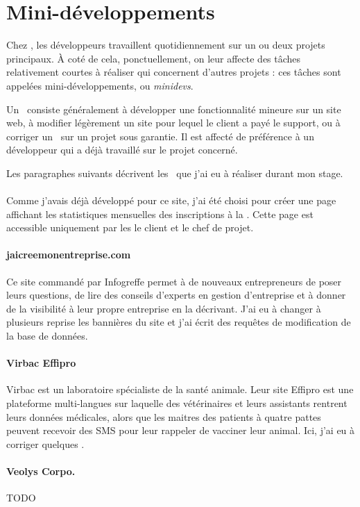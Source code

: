 \section{Mini-développements}

Chez \asl, les développeurs travaillent quotidiennement sur un ou deux projets principaux. À coté de cela, ponctuellement, on leur affecte des tâches relativement courtes à réaliser qui concernent d'autres projets : ces tâches sont appelées mini-développements, ou \emph{minidevs}.

Un \aminidev\ consiste généralement à développer une fonctionnalité mineure sur un site web, à modifier légèrement un site pour lequel le client a payé le support, ou à corriger un \abug\ sur un projet sous garantie. Il est affecté de préférence à un développeur qui a déjà travaillé sur le projet concerné. 

Les paragraphes suivants décrivent les \aminidevs\ que j'ai eu à réaliser durant mon stage.

\paragraph{\alc} Comme j'avais déjà développé pour ce site, j'ai été choisi pour créer une page affichant les statistiques mensuelles des inscriptions à la \anewsletter. Cette page est accessible uniquement par les le client et le chef de projet.

\paragraph{jaicreemonentreprise.com} Ce site commandé par Infogreffe permet à de nouveaux entrepreneurs de poser leurs questions, de lire des conseils d'experts en gestion d'entreprise et à donner de la visibilité à leur propre entreprise en la décrivant. J'ai eu à changer à plusieurs reprise les bannières du site et j'ai écrit des requêtes de modification de la base de données.

\paragraph{Virbac Effipro} Virbac est un laboratoire spécialiste de la santé animale. Leur site Effipro est une plateforme multi-langues sur laquelle des vétérinaires et leurs assistants rentrent leurs données médicales, alors que les maitres des patients à quatre pattes peuvent recevoir des SMS pour leur rappeler de vacciner leur animal. Ici, j'ai eu à corriger quelques \abugs.

\paragraph{Veolys Corpo.} TODO
